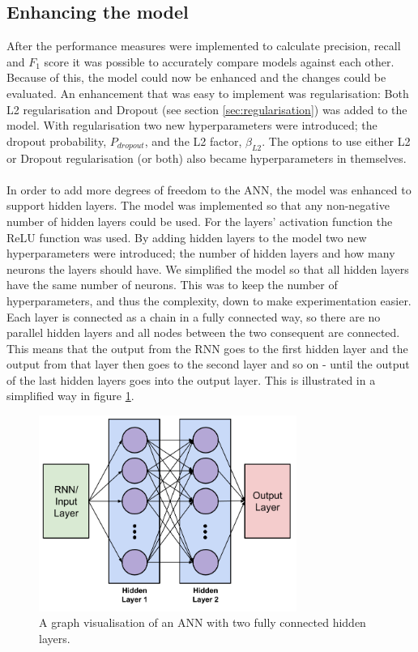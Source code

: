 \subsection{Enhancing the model}
After the performance measures were implemented to calculate precision, recall and $F_1$ score it was possible to accurately compare models against each other. Because of this, the model could now be enhanced and the changes could be evaluated. An enhancement that was easy to implement was regularisation: Both L2 regularisation and Dropout (see section \ref{sec:regularisation}) was added to the model. With regularisation two new hyperparameters were introduced; the dropout probability, $P_{dropout}$, and the L2 factor, $\beta_{L2}$. The options to use either L2 or Dropout regularisation (or both) also became hyperparameters in themselves.
\\\\
In order to add more degrees of freedom to the ANN, the model was enhanced to support hidden layers. The model was implemented so that any non-negative number of hidden layers could be used. For the layers' activation function the ReLU function was used. By adding hidden layers to the model two new hyperparameters were introduced; the number of hidden layers and how many neurons the layers should have. We simplified the model so that all hidden layers have the same number of neurons. This was to keep the number of hyperparameters, and thus the complexity, down to make experimentation easier. Each layer is connected as a chain in a fully connected way, so there are no parallel hidden layers and all nodes between the two consequent are connected. This means that the output from the RNN goes to the first hidden layer and the output from that layer then goes to the second layer and so on - until the output of the last hidden layers goes into the output layer. This is illustrated in a simplified way in figure \ref{fig:ann_hidden_layers}.
\begin{figure}[h]
    \centering
    \includegraphics[width=0.75\textwidth]{figure/method/ann_hidden_layers}
    \caption{A graph visualisation of an ANN with two fully connected hidden layers.}
    \label{fig:ann_hidden_layers}
\end{figure}
